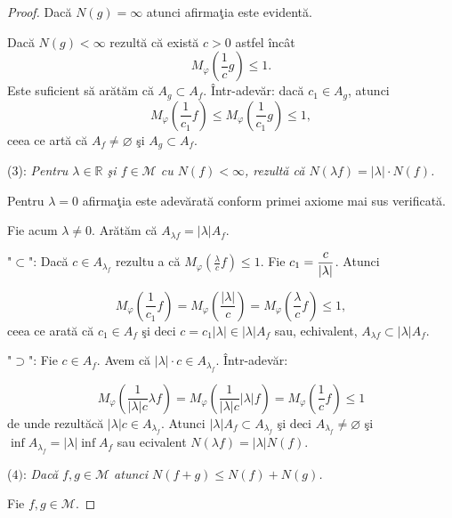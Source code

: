 \documentclass[ a4paper, 12pt]{report}
\theoremstyle{definition}
\theoremstyle{remark}
\numberwithin{equation}{section}
\begin{document}
\begin{proof}
Dac\u a $N(g) = \infty$ atunci afirma\c tia este evident\u a.

Dac\u a $N(g) < \infty$ rezult\u a c\u a exist\u a $c >0$ astfel \^inc\^at
$$M_\varphi (\frac{1}{c} g) \leq 1.$$
Este suficient s\u a ar\u at\u am c\u a $A_g \subset A_f$. \^ Intr-adev\u ar: dac\u a $c_1 \in A_g$, atunci
$$M_\varphi(\frac{1}{c_1}f) \leq M_\varphi(\frac{1}{c_1}g) \leq 1,$$ ceea ce art\u a c\u a $A_f \neq \varnothing$ \c si $A_g \subset A_f$.

\smallskip

($3$): {\it Pentru $\lambda \in \mathbb{R}$ \c si $f \in \mathcal{M}$ cu $N(f) < \infty$, rezult\u a c\u a $N(\lambda f) = \lvert \lambda \rvert\cdot N(f)$.}

\smallskip

Pentru $\lambda = 0$ afirma\c tia este adev\u arat\u a conform primei axiome mai sus verificat\u a.

Fie acum $\lambda \neq 0$. Ar\u at\u am c\u a $A_{\lambda f} = \lvert \lambda \rvert A_f$.

"$\subset$": Dac\u a $c \in A_{\lambda_f}$ rezultu a c\u a $M_\varphi\left (\frac{\lambda}{c}f \right ) \leq 1$.
Fie $c_1 = \displaystyle\frac{c}{\lvert \lambda \rvert}$. Atunci

$$M_\varphi\left (\frac{1}{c_1}f \right ) = M_\varphi \left (\frac{\lvert \lambda \rvert}{c} \right ) = M_\varphi \left (\frac{\lambda}{c} f \right ) \leq 1,$$
ceea ce arat\u a c\u a $c_1 \in A_f$ \c si deci $ c = c_1 \lvert \lambda \rvert \in \lvert \lambda \rvert A_f$ sau, echivalent, $A_{\lambda f} \subset \lvert \lambda \rvert A_f$.

"$\supset$": Fie $c \in A_f$. Avem c\u a $\lvert \lambda \rvert\cdot c \in A_{\lambda_f}$. \^ Intr-adev\u ar:

$$M_\varphi \left (\frac{1}{\lvert \lambda\rvert c} \lambda f \right ) = M_\varphi \left (\frac{1}{\lvert \lambda\rvert c}\lvert\lambda\rvert f \right ) = M_\varphi \left (\frac{1}{c} f \right ) \leq 1$$ de unde rezult\u ac\u a  $\lvert \lambda \rvert c \in A_{\lambda_f}$. Atunci $\lvert\lambda \rvert A_f \subset A_{\lambda_f}$ \c si deci $A_{\lambda_f} \neq \varnothing$ \c si $\inf A_{\lambda_f} = \lvert \lambda \rvert \inf A_f$ sau ecivalent $N(\lambda f) = \lvert  \lambda \rvert N(f)$.

\smallskip

($4)$: {\it Dac\u a $f,g \in \mathcal{M}$ atunci $N(f+g) \leq N(f) + N(g)$.}

\smallskip

Fie $f,g \in \mathcal{M}$.


\end{proof}
\end{document}
